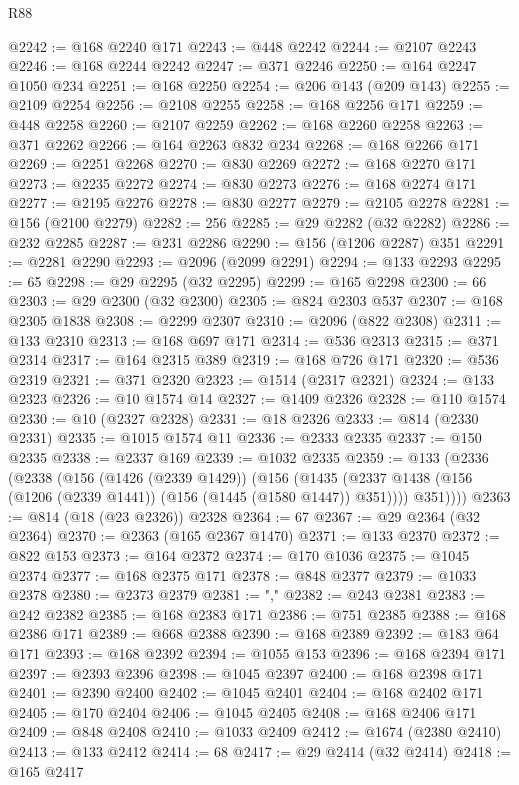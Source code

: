 \begin{lexlean}{R88}
\begin{coremodule}
@2242 := @168 @2240 @171
@2243 := @448 @2242
@2244 := @2107 @2243
@2246 := @168 @2244 @2242
@2247 := @371 @2246
@2250 := @164 @2247 @1050 @234
@2251 := @168 @2250
@2254 := @206 @143 (@209 @143)
@2255 := @2109 @2254
@2256 := @2108 @2255
@2258 := @168 @2256 @171
@2259 := @448 @2258
@2260 := @2107 @2259
@2262 := @168 @2260 @2258
@2263 := @371 @2262
@2266 := @164 @2263 @832 @234
@2268 := @168 @2266 @171
@2269 := @2251 @2268
@2270 := @830 @2269
@2272 := @168 @2270 @171
@2273 := @2235 @2272
@2274 := @830 @2273
@2276 := @168 @2274 @171
@2277 := @2195 @2276
@2278 := @830 @2277
@2279 := @2105 @2278
@2281 := @156 (@2100 @2279)
@2282 := 256
@2285 := @29 @2282 (@32 @2282)
@2286 := @232 @2285
@2287 := @231 @2286
@2290 := @156 (@1206 @2287) @351
@2291 := @2281 @2290
@2293 := @2096 (@2099 @2291)
@2294 := @133 @2293
@2295 := 65
@2298 := @29 @2295 (@32 @2295)
@2299 := @165 @2298
@2300 := 66
@2303 := @29 @2300 (@32 @2300)
@2305 := @824 @2303 @537
@2307 := @168 @2305 @1838
@2308 := @2299 @2307
@2310 := @2096 (@822 @2308)
@2311 := @133 @2310
@2313 := @168 @697 @171
@2314 := @536 @2313
@2315 := @371 @2314
@2317 := @164 @2315 @389
@2319 := @168 @726 @171
@2320 := @536 @2319
@2321 := @371 @2320
@2323 := @1514 (@2317 @2321)
@2324 := @133 @2323
@2326 := @10 @1574 @14
@2327 := @1409 @2326
@2328 := @110 @1574
@2330 := @10 (@2327 @2328)
@2331 := @18 @2326
@2333 := @814 (@2330 @2331)
@2335 := @1015 @1574 @11
@2336 := @2333 @2335
@2337 := @150 @2335
@2338 := @2337 @169
@2339 := @1032 @2335
@2359 := @133
    (@2336
      (@2338
        (@156
          (@1426 (@2339 @1429))
          (@156
            (@1435 (@2337 @1438 (@156 (@1206 (@2339 @1441)) (@156 (@1445 (@1580 @1447)) @351))))
            @351))))
@2363 := @814 (@18 (@23 @2326)) @2328
@2364 := 67
@2367 := @29 @2364 (@32 @2364)
@2370 := @2363 (@165 @2367 @1470)
@2371 := @133 @2370
@2372 := @822 @153
@2373 := @164 @2372
@2374 := @170 @1036
@2375 := @1045 @2374
@2377 := @168 @2375 @171
@2378 := @848 @2377
@2379 := @1033 @2378
@2380 := @2373 @2379
@2381 := ","
@2382 := @243 @2381
@2383 := @242 @2382
@2385 := @168 @2383 @171
@2386 := @751 @2385
@2388 := @168 @2386 @171
@2389 := @668 @2388
@2390 := @168 @2389
@2392 := @183 @64 @171
@2393 := @168 @2392
@2394 := @1055 @153
@2396 := @168 @2394 @171
@2397 := @2393 @2396
@2398 := @1045 @2397
@2400 := @168 @2398 @171
@2401 := @2390 @2400
@2402 := @1045 @2401
@2404 := @168 @2402 @171
@2405 := @170 @2404
@2406 := @1045 @2405
@2408 := @168 @2406 @171
@2409 := @848 @2408
@2410 := @1033 @2409
@2412 := @1674 (@2380 @2410)
@2413 := @133 @2412
@2414 := 68
@2417 := @29 @2414 (@32 @2414)
@2418 := @165 @2417

\end{coremodule}
\end{lexlean}
